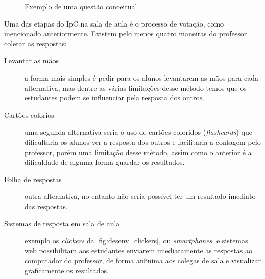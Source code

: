 \begin{figure}[!htb]
  \centering
  \caption{Exemplo de uma questão conceitual}
\end{figure}

Uma das etapas do IpC na sala de aula é o processo de votação, como mencionado
anteriormente. Existem pelo menos quatro maneiras \cite{Crouch2007} do professor coletar as respostas:

\begin{description}
  \item[Levantar as mãos] a forma mais simples é pedir para os alunos levantarem as mãos para cada alternativa,
  mas dentre as várias limitações desse método temos que os estudantes podem se
  influenciar pela resposta dos outros.
  \item[Cartões colorios] uma segunda alternativa seria o uso de
  cartões coloridos (\textit{flashcards}) que dificultaria os alunos ver a resposta
  dos outros e facilitaria a contagem pelo professor, porém uma limitação desse método,
  assim como o anterior é a dificuldade de alguma forma guardar os resultados.
  \item[Folha de respostas] outra alternativa, no entanto não seria possível ter
  um resultado imediato das respostas.
  \item[Sistemas de resposta em sala de aula] exemplo os \textit{clickers} da \autoref{fig:desenv_clickers}, ou \textit{smartphones},
  e sistemas web possibilitam aos estudantes enviarem imediatamente as respostas ao
  computador do professor, de forma anônima aos colegas de sala e visualizar graficamente
  os resultados.
\end{description}

